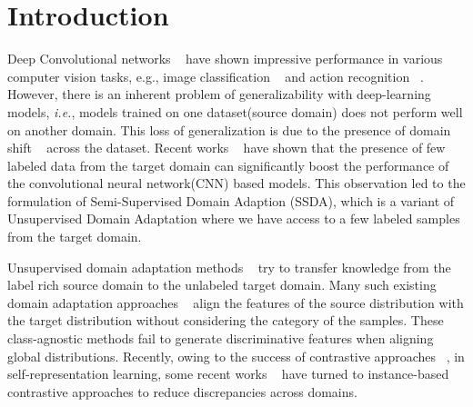 \section{Introduction}

Deep Convolutional networks ~\cite{Krizhevsky2012ImageNetCW,Szegedy2017Inceptionv4IA}  have shown impressive performance in various computer vision tasks, e.g., image classification ~\cite{He2016DeepRL,Huang2017DenselyCC} and action recognition ~\cite{Simonyan2014TwoStreamCN,Ji20133DCN,Wang2019TemporalSN,Lin2019TSMTS}. However, there is an inherent problem of generalizability with deep-learning models, \textit{i.e.}, models trained on one dataset(source domain) does not perform well on another domain. This loss of generalization is due to the presence of domain shift ~\cite{Donahue2014DeCAFAD, Tzeng2017AdversarialDD} across the dataset. Recent works ~\cite{Saito2019SemiSupervisedDA, Kim2020AttractPA} have shown that the presence of few labeled data from the target domain can significantly boost the performance of the convolutional neural network(CNN) based models. 
This observation led to the formulation of Semi-Supervised Domain Adaption (SSDA), which is a variant of Unsupervised Domain Adaptation where we have access to a few labeled samples from the target domain.

Unsupervised domain adaptation methods ~\cite{Pei2018MultiAdversarialDA, Ganin2015UnsupervisedDA, Long2016UnsupervisedDA, Sun2016DeepCC, Long2018ConditionalAD} try to transfer knowledge from the label rich source domain to the unlabeled target domain. Many such existing domain adaptation approaches ~\cite{Pei2018MultiAdversarialDA, Ganin2015UnsupervisedDA, Sun2016DeepCC} align the features of the source distribution with the target distribution without considering the category of the samples.
 These class-agnostic methods fail to generate discriminative features when aligning global distributions. 
Recently, owing to the success of contrastive approaches ~\cite{Chen2020ASF,He2020MomentumCF,Oord2018RepresentationLW}, in self-representation learning, some recent works ~\cite{Kang2019ContrastiveAN,Kim2020CrossdomainSL} have turned to instance-based contrastive approaches to reduce discrepancies across domains. 

